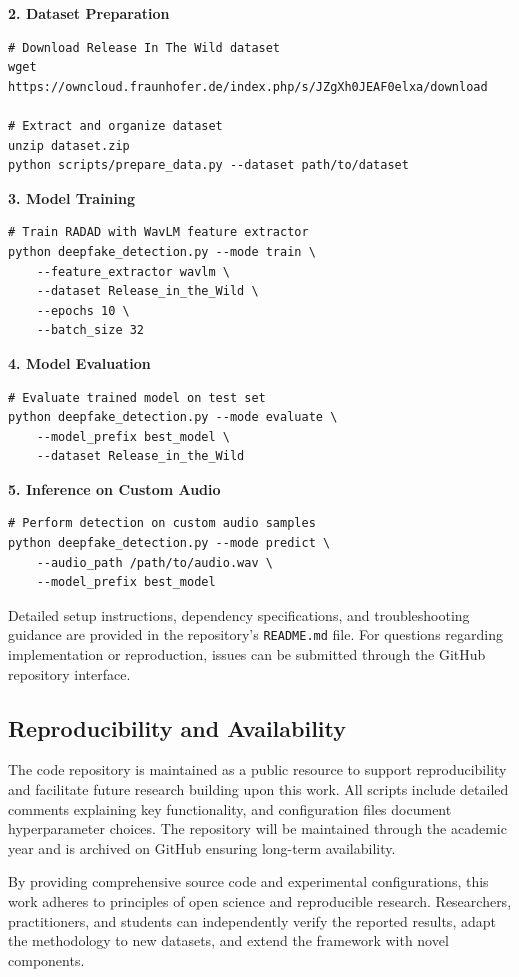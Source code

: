 \textbf{2. Dataset Preparation}

\begin{verbatim}
# Download Release In The Wild dataset
wget https://owncloud.fraunhofer.de/index.php/s/JZgXh0JEAF0elxa/download

# Extract and organize dataset
unzip dataset.zip
python scripts/prepare_data.py --dataset path/to/dataset
\end{verbatim}

\textbf{3. Model Training}

\begin{verbatim}
# Train RADAD with WavLM feature extractor
python deepfake_detection.py --mode train \
    --feature_extractor wavlm \
    --dataset Release_in_the_Wild \
    --epochs 10 \
    --batch_size 32
\end{verbatim}

\textbf{4. Model Evaluation}

\begin{verbatim}
# Evaluate trained model on test set
python deepfake_detection.py --mode evaluate \
    --model_prefix best_model \
    --dataset Release_in_the_Wild
\end{verbatim}


\textbf{5. Inference on Custom Audio}

\begin{verbatim}
# Perform detection on custom audio samples
python deepfake_detection.py --mode predict \
    --audio_path /path/to/audio.wav \
    --model_prefix best_model
\end{verbatim}


Detailed setup instructions, dependency specifications, and troubleshooting guidance are provided in the repository's \texttt{README.md} file. For questions regarding implementation or reproduction, issues can be submitted through the GitHub repository interface.

\subsection{Reproducibility and Availability}\label{apx:github_repo:reproducibility}

The code repository is maintained as a public resource to support reproducibility and facilitate future research building upon this work. All scripts include detailed comments explaining key functionality, and configuration files document hyperparameter choices. The repository will be maintained through the academic year and is archived on GitHub ensuring long-term availability.

By providing comprehensive source code and experimental configurations, this work adheres to principles of open science and reproducible research. Researchers, practitioners, and students can independently verify the reported results, adapt the methodology to new datasets, and extend the framework with novel components.